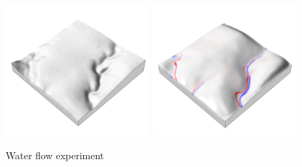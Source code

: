 \documentclass[prodmode,acmtochi]{acmsmall} %
\begin{document}
\begin{figure}[h!]
\begin{center}
		\includegraphics[width=0.48\textwidth]{images/render_3d/dem_difference_5.png}
		\includegraphics[width=0.48\textwidth]{images/render_3d/mean_depth_difference_5.png}
	\caption{Water flow experiment}
	\label{fig:}
\end{center}
\end{figure}


\end{document}
